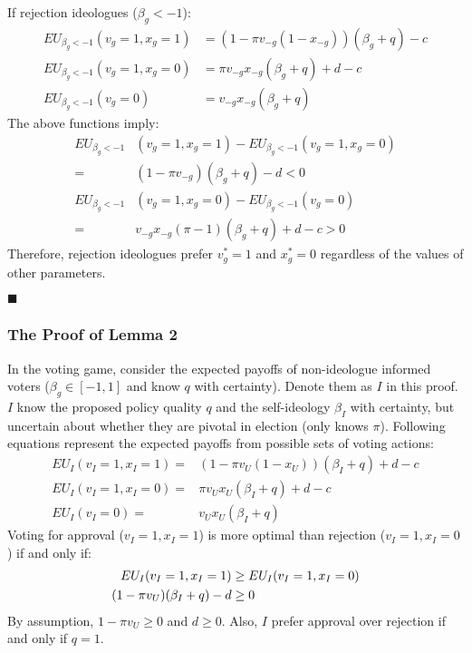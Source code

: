 \par If rejection ideologues ($\beta_g<-1$):
\begin{align*}
EU_{\beta_g<-1}(v_g=1, x_g=1) &= (1-\pi v_{-g} (1- x_{-g}))(\beta_g + q)  - c \\
EU_{\beta_g<-1}(v_g=1, x_g=0) &= \pi v_{-g} x_{-g} (\beta_g + q) + d - c \\
EU_{\beta_g<-1}(v_g=0) &= v_{-g} x_{-g} (\beta_g + q)
\end{align*} 
\noindent The above functions imply:
\begin{align*}
EU_{\beta_g<-1}&(v_g=1, x_g=1) - EU_{\beta_g<-1}(v_g=1, x_g=0) \\
=& (1- \pi v_{-g})(\beta_g + q) - d < 0 \\
EU_{\beta_g<-1}&(v_g=1, x_g=0) - EU_{\beta_g<-1}(v_g=0) \\
=& v_{-g} x_{-g} (\pi-1) (\beta_g + q) + d -c  > 0
\end{align*}
\noindent Therefore, rejection ideologues prefer $v^*_g=1$ and $x^*_g=0$ regardless of the values of other parameters.

\hfill $\blacksquare$

\subsubsection{The Proof of Lemma 2}

\par In the voting game, consider the expected payoffs of non-ideologue informed voters ($\beta_g \in [-1,1]$ and know $q$ with certainty). Denote them as $I$ in this proof. $I$   
know the proposed policy quality $q$ and the self-ideology $\beta_I$ with certainty, but uncertain about whether they are pivotal in election (only knows $\pi$). Following equations represent the expected payoffs from possible sets of voting actions:
\begin{align*}
EU_I(v_I=1,x_I=1) = & (1-\pi v_U (1-x_U) ) (\beta_I + q) + d - c \\
EU_I(v_I=1,x_I=0) = &\pi v_U x_U (\beta_I + q) + d - c \\
EU_I(v_I=0) = &v_U  x_U (\beta_I + q)   
\end{align*}
\noindent Voting for approval ($v_I=1,x_I=1$) is more optimal than rejection ($v_I=1,x_I=0$) if and only if:
\begin{align*}
EU_I(v_I=1,x_I=1) &\geq EU_I(v_I=1,x_I=0)  \notag \\
(1 -\pi v_U ) (\beta_I + q) - d &\geq 0 
\end{align*}
\noindent By assumption, $1-\pi v_U \geq 0$ and $d \geq 0$. Also, $I$ prefer approval over rejection if and only if $q=1$.

